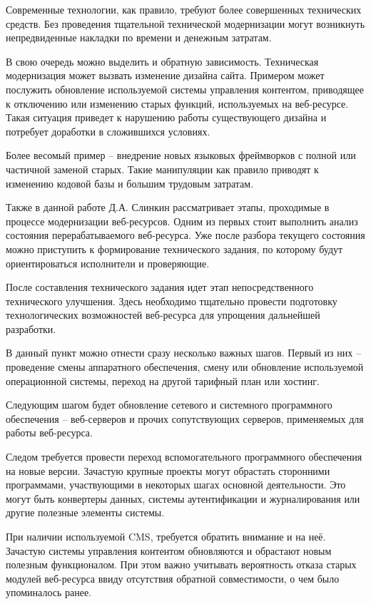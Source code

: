 Современные технологии, как правило, требуют более совершенных технических средств.
Без проведения тщательной технической модернизации могут возникнуть непредвиденные накладки по времени и денежным затратам.

В свою очередь можно выделить и обратную зависимость.
Техническая модернизация может вызвать изменение дизайна сайта.
Примером может послужить обновление используемой системы управления контентом, приводящее к отключению или изменению старых функций, используемых на веб-ресурсе.
Такая ситуация приведет к нарушению работы существующего дизайна и потребует доработки в сложившихся условиях.

Более весомый пример -- внедрение новых языковых фреймворков с полной или частичной заменой старых.
Такие манипуляции как правило приводят к изменению кодовой базы и большим трудовым затратам. 

Также в данной работе Д.А. Слинкин рассматривает этапы, проходимые в процессе модернизации веб-ресурсов.
Одним из первых стоит выполнить анализ состояния перерабатываемого веб-ресурса.
Уже после разбора текущего состояния можно приступить к формирование технического задания, по которому будут ориентироваться исполнители и проверяющие.

После составления технического задания идет этап непосредственного технического улучшения.
Здесь необходимо тщательно провести подготовку технологических возможностей веб-ресурса для упрощения дальнейшей разработки.

В данный пункт можно отнести сразу несколько важных шагов.
Первый из них -- проведение смены аппаратного обеспечения, смену или обновление используемой операционной системы, переход на другой тарифный план или хостинг.

Следующим шагом будет обновление сетевого и системного программного обеспечения -- веб-серверов и прочих сопутствующих серверов, применяемых для работы веб-ресурса.

Следом требуется провести переход вспомогательного программного обеспечения на новые версии.
Зачастую крупные проекты могут обрастать сторонними программами, участвующими в некоторых шагах основной деятельности.
Это могут быть конвертеры данных, системы аутентификации и журналирования или другие полезные элементы системы.

При наличии используемой CMS, требуется обратить внимание и на неё.
Зачастую системы управления контентом обновляются и обрастают новым полезным функционалом.
При этом важно учитывать вероятность отказа старых модулей веб-ресурса ввиду отсутствия обратной совместимости, о чем было упоминалось ранее.

